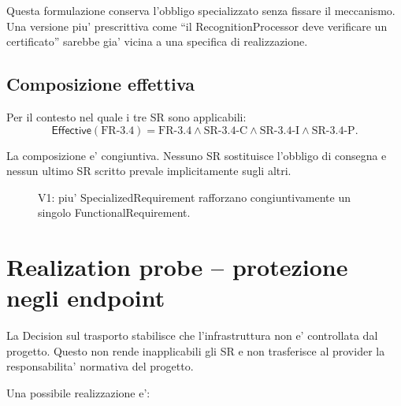 \documentclass[11pt,a4paper]{article}
\begin{document}
Questa formulazione conserva l'obbligo specializzato senza fissare il meccanismo. Una versione piu' prescrittiva come ``il RecognitionProcessor deve verificare un certificato'' sarebbe gia' vicina a una specifica di realizzazione.

\subsection{Composizione effettiva}

Per il contesto nel quale i tre SR sono applicabili:
\[
\mathsf{Effective}(\mathrm{FR\mbox{-}3.4}) =
\mathrm{FR\mbox{-}3.4}
\land \mathrm{SR\mbox{-}3.4\mbox{-}C}
\land \mathrm{SR\mbox{-}3.4\mbox{-}I}
\land \mathrm{SR\mbox{-}3.4\mbox{-}P}.
\]

La composizione e' congiuntiva. Nessuno SR sostituisce l'obbligo di consegna e nessun ultimo SR scritto prevale implicitamente sugli altri.

\begin{figure}[h]
\centering
{}
\caption{V1: piu' SpecializedRequirement rafforzano congiuntivamente un singolo FunctionalRequirement.}
\end{figure}

\section{Realization probe -- protezione negli endpoint}

La Decision sul trasporto stabilisce che l'infrastruttura non e' controllata dal progetto. Questo non rende inapplicabili gli SR e non trasferisce al provider la responsabilita' normativa del progetto.

Una possibile realizzazione e':
\end{document}
